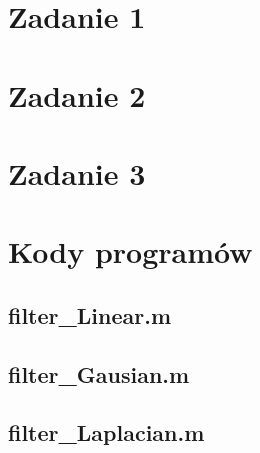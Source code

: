 



 


\section*{Zadanie 1}




\section*{Zadanie 2}




\section*{Zadanie 3}






\newpage \section*{Kody programów}
\subsection*{ filter\_Linear.m    } \newpage
\subsection*{ filter\_Gausian.m   } \newpage
\subsection*{ filter\_Laplacian.m } \newpage
